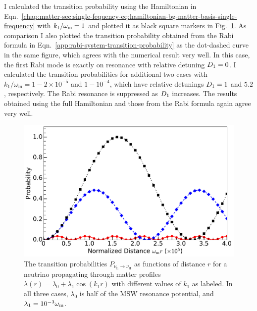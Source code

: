 
I calculated the transition probability using the Hamiltonian in Eqn.~\ref{chap:matter-sec:single-fequency-eq:hamiltonian-bg-matter-basis-single-frequency} with $k_1/\omega_\mathrm m=1$ and plotted it as black square markers in Fig.~\ref{fig-rabiOscillationsNeutrinoCoincidence}. As comparison I also plotted the transition probability obtained from the Rabi formula in Eqn.~\ref{app:rabi-system-transition-probability} as the dot-dashed curve in the same figure, which agrees with the numerical result very well. In this case, the first Rabi mode is exactly on resonance with relative detuning $D_1=0$. I calculated the transition probabilities for additional two cases with $k_1/\omega_\mathrm{m}=1-2\times 10^{-5}$ and $1-10^{-4}$, which have relative detunings $D_1 = 1$ and $5.2$, respectively. The Rabi resonance is suppressed as $D_1$ increases. The results obtained using the full Hamiltonian and those from the Rabi formula again agree very well. 

\begin{figure}[h!tbp]
                \includegraphics[width=\columnwidth]{chapters/assets/rabi/rabiOscillationsNeutrinoCoincidence-single-frequency}
                \caption{The transition probabilities $P_{\nu_\mathrm{L}\to\nu_\mathrm{H}}$ as functions of distance $r$ for a neutrino propagating through matter profiles $\lambda(r)=\lambda_0 + \lambda_1 \cos (k_1 r)$ with different values of $k_1$ as labeled. In all three cases, $\lambda_0$ is half of the MSW resonance potential, and $\lambda_1=10^{-3}\omega_\mathrm m$.}
                \label{fig-rabiOscillationsNeutrinoCoincidence}
\end{figure}

